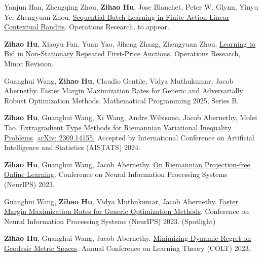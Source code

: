 \documentclass[letterpaper,10pt]{article}
\begin{document}
\begin{description}[font=$\bullet$]
    \item Yanjun Han, Zhengqing Zhou, {\textbf{Zihao Hu}}, Jose Blanchet, Peter W. Glynn, Yinyu Ye, Zhengyuan Zhou. \href{https://arxiv.org/abs/2004.06321}{Sequential Batch Learning in Finite-Action Linear Contextual Bandits}. Operations Research, to appear.
    \item {\textbf{Zihao Hu}}, Xiaoyu Fan, Yuan Yao, Jiheng Zhang, Zhengyuan Zhou. \href{https://arxiv.org/abs/2501.13358}{Learning to Bid in Non-Stationary Repeated First-Price Auctions}. Operations Research, Minor Revision.
    \item Guanghui Wang, {\textbf{Zihao Hu}}, Claudio Gentile, Vidya Muthukumar, Jacob Abernethy. Faster Margin Maximization Rates for Generic and Adversarially Robust Optimization Methods. Mathematical Programming 2025, Series B.
    \item {\textbf{Zihao Hu}}, Guanghui Wang, Xi Wang, Andre Wibisono, Jacob Abernethy, Molei Tao. \href{http://arxiv.org/abs/2309.14155}{Extragradient Type Methods for Riemannian Variational Inequality Problems}. \href{http://arxiv.org/abs/2309.14155}{arXiv: 2309.14155.} Accepted by International Conference on Artificial Intelligence and Statistics (AISTATS) 2024.
    \item {\textbf{Zihao Hu}, Guanghui Wang, Jacob Abernethy. \href{https://openreview.net/pdf?id=szFqlNRxeS}{On Riemannian Projection-free Online Learning}.  }  Conference on Neural Information Processing Systems (NeurIPS) 2023.
    
    \item {Guanghui Wang, \textbf{Zihao Hu}, Vidya Muthukumar, Jacob Abernethy. \href{https://openreview.net/pdf?id=vTug54Uunq}{Faster Margin Maximization Rates for Generic Optimization Methods}.}  Conference on Neural Information Processing Systems (NeurIPS) 2023. (Spotlight)
    
    \item {\textbf{Zihao Hu}, Guanghui Wang, Jacob Abernethy. \href{https://proceedings.mlr.press/v195/hu23a/hu23a.pdf}{Minimizing Dynamic Regret on Geodesic Metric Spaces}.  Annual Conference on Learning Theory (COLT) 2023.}
    

\end{description}
\end{document}
